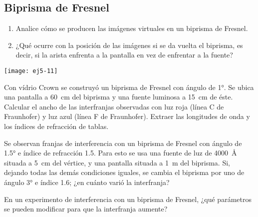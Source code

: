 \subsection*{Biprisma de Fresnel}

\item 
\begin{minipage}[t][2.7cm]{0.6\textwidth}
\begin{enumerate}
	\item Analice cómo se producen las imágenes virtuales en un biprisma de Fresnel.
	\item ¿Qué ocurre con la posición de las imágenes si se da vuelta el biprisma, es decir, si la arista enfrenta a la pantalla en vez de enfrentar a la fuente?
\end{enumerate}
\end{minipage}
\begin{minipage}[c][1.5cm][t]{0.35\textwidth}
	\texttt{[image: ej5-11]}
\end{minipage}



\item Con vídrio Crown se construyó un biprisma de Fresnel con ángulo de \ang{1;;}.
Se ubica una pantalla a \SI{60}{\centi\metre} del biprisma y una fuente luminosa a \SI{15}{\centi\metre} de éste.
Calcular el ancho de las interfranjas observadas con luz roja (línea C de Fraunhofer) y luz azul (línea F de Fraunhofer).
Extraer las longitudes de onda y los índices de refracción de tablas.



\item Se observan franjas de interferencia con un biprisma de Fresnel con ángulo de \ang{1.5;;} e índice de refracción \num{1.5}.
Para esto se usa una fuente de luz de \SI{4000}{\angstrom} situada a \SI{5}{\centi\metre} del vértice, y una pantalla situada a \SI{1}{\metre} del biprisma.
Si, dejando todas las demás condiciones iguales, se cambia el biprisma por uno de ángulo \ang{3;;} e índice \num{1.6}; ¿en cuánto varió la interfranja?


\item En un experimento de interferencia con un biprisma de Fresnel, ¿qué parámetros se pueden modificar para que la interfranja aumente?


